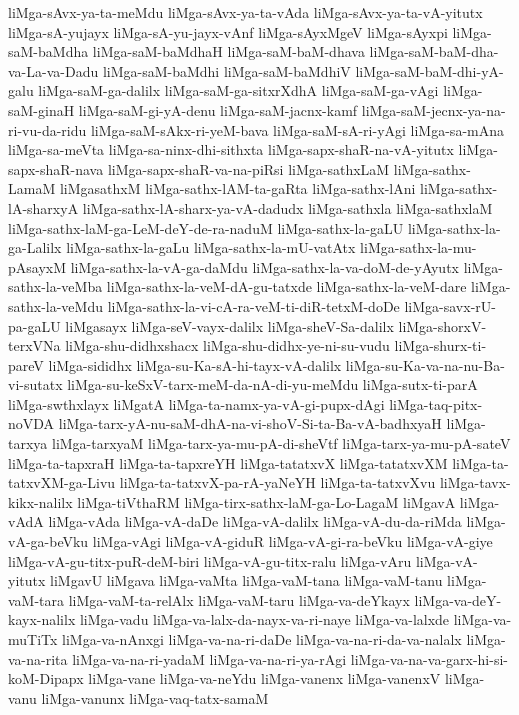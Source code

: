 {liMga-sAvx-ya-ta-meMdu
liMga-sAvx-ya-ta-vAda
liMga-sAvx-ya-ta-vA-yitutx
liMga-sA-yujayx
liMga-sA-yu-jayx-vAnf
liMga-sAyxMgeV
liMga-sAyxpi
liMga-saM-baMdha
liMga-saM-baMdhaH
liMga-saM-baM-dhava
liMga-saM-baM-dha-va-La-va-Dadu
liMga-saM-baMdhi
liMga-saM-baMdhiV
liMga-saM-baM-dhi-yA-galu
liMga-saM-ga-dalilx
liMga-saM-ga-sitxrXdhA
liMga-saM-ga-vAgi
liMga-saM-ginaH
liMga-saM-gi-yA-denu
liMga-saM-jacnx-kamf
liMga-saM-jecnx-ya-na-ri-vu-da-ridu
liMga-saM-sAkx-ri-yeM-bava
liMga-saM-sA-ri-yAgi
liMga-sa-mAna
liMga-sa-meVta
liMga-sa-ninx-dhi-sithxta
liMga-sapx-shaR-na-vA-yitutx
liMga-sapx-shaR-nava
liMga-sapx-shaR-va-na-piRsi
liMga-sathxLaM
liMga-sathx-LamaM
liMgasathxM
liMga-sathx-lAM-ta-gaRta
liMga-sathx-lAni
liMga-sathx-lA-sharxyA
liMga-sathx-lA-sharx-ya-vA-dadudx
liMga-sathxla
liMga-sathxlaM
liMga-sathx-laM-ga-LeM-deY-de-ra-naduM
liMga-sathx-la-gaLU
liMga-sathx-la-ga-Lalilx
liMga-sathx-la-gaLu
liMga-sathx-la-mU-vatAtx
liMga-sathx-la-mu-pAsayxM
liMga-sathx-la-vA-ga-daMdu
liMga-sathx-la-va-doM-de-yAyutx
liMga-sathx-la-veMba
liMga-sathx-la-veM-dA-gu-tatxde
liMga-sathx-la-veM-dare
liMga-sathx-la-veMdu
liMga-sathx-la-vi-cA-ra-veM-ti-diR-tetxM-doDe
liMga-savx-rU-pa-gaLU
liMgasayx
liMga-seV-vayx-dalilx
liMga-sheV-Sa-dalilx
liMga-shorxV-terxVNa
liMga-shu-didhxshacx
liMga-shu-didhx-ye-ni-su-vudu
liMga-shurx-ti-pareV
liMga-sididhx
liMga-su-Ka-sA-hi-tayx-vA-dalilx
liMga-su-Ka-va-na-nu-Ba-vi-sutatx
liMga-su-keSxV-tarx-meM-da-nA-di-yu-meMdu
liMga-sutx-ti-parA
liMga-swthxlayx
liMgatA
liMga-ta-namx-ya-vA-gi-pupx-dAgi
liMga-taq-pitx-noVDA
liMga-tarx-yA-nu-saM-dhA-na-vi-shoV-Si-ta-Ba-vA-badhxyaH
liMga-tarxya
liMga-tarxyaM
liMga-tarx-ya-mu-pA-di-sheVtf
liMga-tarx-ya-mu-pA-sateV
liMga-ta-tapxraH
liMga-ta-tapxreYH
liMga-tatatxvX
liMga-tatatxvXM
liMga-ta-tatxvXM-ga-Livu
liMga-ta-tatxvX-pa-rA-yaNeYH
liMga-ta-tatxvXvu
liMga-tavx-kikx-nalilx
liMga-tiVthaRM
liMga-tirx-sathx-laM-ga-Lo-LagaM
liMgavA
liMga-vAdA
liMga-vAda
liMga-vA-daDe
liMga-vA-dalilx
liMga-vA-du-da-riMda
liMga-vA-ga-beVku
liMga-vAgi
liMga-vA-giduR
liMga-vA-gi-ra-beVku
liMga-vA-giye
liMga-vA-gu-titx-puR-deM-biri
liMga-vA-gu-titx-ralu
liMga-vAru
liMga-vA-yitutx
liMgavU
liMgava
liMga-vaMta
liMga-vaM-tana
liMga-vaM-tanu
liMga-vaM-tara
liMga-vaM-ta-relAlx
liMga-vaM-taru
liMga-va-deYkayx
liMga-va-deY-kayx-nalilx
liMga-vadu
liMga-va-lalx-da-nayx-va-ri-naye
liMga-va-lalxde
liMga-va-muTiTx
liMga-va-nAnxgi
liMga-va-na-ri-daDe
liMga-va-na-ri-da-va-nalalx
liMga-va-na-rita
liMga-va-na-ri-yadaM
liMga-va-na-ri-ya-rAgi
liMga-va-na-va-garx-hi-si-koM-Dipapx
liMga-vane
liMga-va-neYdu
liMga-vanenx
liMga-vanenxV
liMga-vanu
liMga-vanunx
liMga-vaq-tatx-samaM
}
